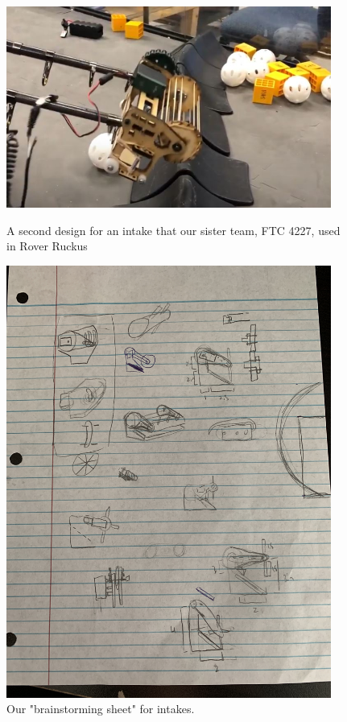 \begin{figure}[ht]
\centering
\begin{minipage}[b]{.48\textwidth}
  \centering
  \includegraphics[width=0.95\textwidth]{Meetings/August/08-20-21/8-18-21_CAD_Image3 - Nathan Forrer.jpg}
  \caption{A second design for an intake that our sister team, FTC 4227, used in Rover Ruckus}
  \label{fig:082021_3}
\end{minipage}%
\hfill%
\begin{minipage}[b]{.48\textwidth}
  \centering
  \includegraphics[width=0.95\textwidth]{Meetings/August/08-20-21/8-18-21_CAD_Image4 - Nathan Forrer.jpg}
  \caption{Our "brainstorming sheet" for intakes.}
  \label{fig:082021_4}
\end{minipage}
\end{figure}

